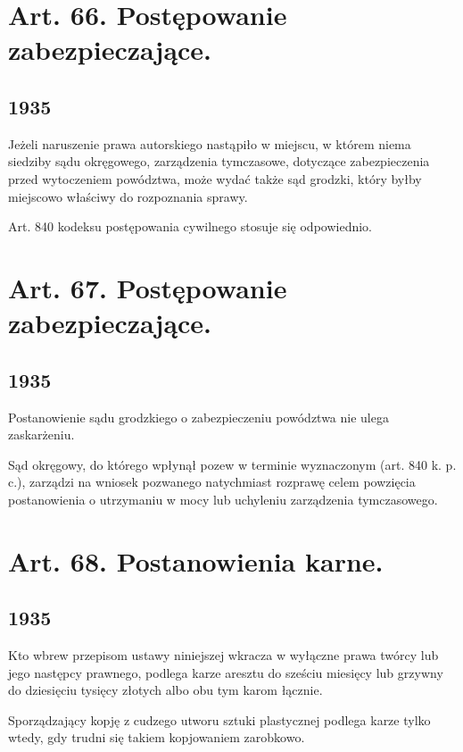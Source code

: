 \documentclass[withmarginpar]{book}
\begin{document}
\section{Art. 66. Postępowanie zabezpieczające.}
\label{sec:art.-66}
\subsection{1935}
\label{sec:art.-66-1}

Jeżeli naruszenie prawa autorskiego nastąpiło w miejscu, w którem
niema siedziby sądu okręgowego, zarządzenia tymczasowe, dotyczące
zabezpieczenia przed wytoczeniem powództwa, może wydać także sąd
grodzki, który byłby miejscowo właściwy do rozpoznania sprawy.

Art. 840 kodeksu postępowania cywilnego stosuje się odpowiednio.

\section{Art. 67. Postępowanie zabezpieczające.}
\label{sec:art.-67}
\subsection{1935}
\label{sec:art.-67-1}

Postanowienie sądu grodzkiego o zabezpieczeniu powództwa nie ulega
zaskarżeniu.

Sąd okręgowy, do którego wpłynął pozew w terminie wyznaczonym
(art. 840 k. p. c.), zarządzi na wniosek pozwanego natychmiast
rozprawę celem powzięcia postanowienia o utrzymaniu w mocy lub
uchyleniu zarządzenia tymczasowego.


\section{Art. 68. Postanowienia karne.}
\label{sec:art.-68}
\subsection{1935}
\label{sec:art.-68-1}

Kto wbrew przepisom ustawy niniejszej wkracza w wyłączne prawa twórcy
lub jego następcy prawnego, podlega karze aresztu do sześciu miesięcy
lub grzywny do dziesięciu tysięcy złotych albo obu tym karom łącznie.

Sporządzający kopję z cudzego utworu sztuki plastycznej podlega karze
tylko wtedy, gdy trudni się takiem kopjowaniem zarobkowo.
\end{document}
